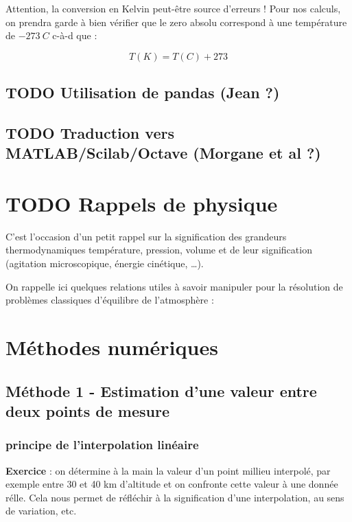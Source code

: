 \documentclass[letterpaper, 11pt]{article}
\begin{document}
\begin{itemize}
Attention, la conversion en Kelvin peut-être source d'erreurs ! Pour nos calculs, on prendra garde à bien vérifier que le zero absolu correspond à une température de \(-273~C\) c-à-d que : 

$$T(K) = T(C) + 273 $$


\subsection{{\bfseries\sffamily TODO} Utilisation de pandas (Jean ?)}
\label{sec:orga378fb5}

\subsection{{\bfseries\sffamily TODO} Traduction vers MATLAB/Scilab/Octave (Morgane et al ?)}
\label{sec:org136cd9b}


\section{{\bfseries\sffamily TODO} Rappels de physique}
\label{sec:orgbef7d4b}

C'est l'occasion d'un petit rappel sur la signification des grandeurs thermodynamiques température, pression, volume et de leur signification (agitation microscopique, énergie cinétique, \ldots{}). 

On rappelle ici quelques relations utiles à savoir manipuler pour la résolution de problèmes classiques d'équilibre de l'atmosphère : 

\section{Méthodes numériques}
\label{sec:org700dc38}

\subsection{Méthode 1 - Estimation d'une valeur entre deux points de mesure}
\label{sec:org8ee4200}

\subsubsection{principe de l'interpolation linéaire}
\label{sec:org9e5444a}


\textbf{Exercice} : on détermine à la main la valeur d'un point millieu interpolé, par exemple entre 30 et 40 km d'altitude et on confronte cette valeur à une donnée rélle. Cela nous permet de réfléchir à la signification d'une interpolation, au sens de variation, etc.


\end{itemize}
\end{document}
